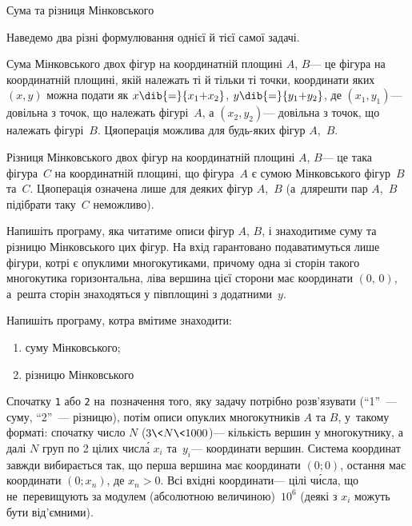 ﻿\begin{problemAllDefault}{Сума та різниця Мінковського}

\begin{small}

Наведемо два різні формулювання однієї й тієї самої задачі.

\noindent\hrulefill

Сума Мінковського двох фігур на координатній площині $A$, $B$\nolinebreak[3] --- це фігура на координатній площині, якій належать ті й тільки ті точки, координати яких $(x,y)$  можна подати як 
$x\dib{{=}}{x_1{+}x_2}$,
$y\dib{{=}}{y_1{+}y_2}$,
де $(x_1,y_1)$\nolinebreak[3] --- довільна з точок, що належать фігурі~$A$, 
а $(x_2,y_2)$\nolinebreak[3] --- довільна з точок, що належать фігурі~$B$.
Ця\nolinebreak[3] операція можлива для будь-яких фігур $A$,~$B$.

Різниця Мінковського двох фігур на координатній площині $A$, $B$\nolinebreak[3] --- це така фігура~$C$ на координатній площині, що фігура~$A$ є сумою Мінковського фігур~$B$ та~$C$. 
Ця\nolinebreak[3] операція означена лише для деяких фігур $A$,~$B$ (а~для\nolinebreak[2] решти пар $A$,~$B$ підібрати таку~$C$ неможливо).

Напишіть програму, яка читатиме описи фігур $A$, $B$, і знаходитиме суму та різницю Мінковського цих фігур. На вхід гарантовано подаватимуться лише фігури, котрі є опуклими многокутиками, причому одна зі сторін такого многокутика горизонтальна, ліва вершина цієї сторони має координати $(0,\,0)$, а~решта сторін знаходяться у півплощині з додатними~$y$.

Напишіть програму, котра вмітиме знаходити:
\begin{enumerate}
\item
суму Мінковського;
\item
різницю Мінковського
\end{enumerate}

\InputFile
Спочатку \texttt{1} або \texttt{2} на~позначення того, яку задачу потрібно розв'язувати (``1''~--- суму, ``2''~--- різницю), потім описи опуклих многокутників $A$ та $B$, у~такому форматі: спочатку число $N$ (${3{\<}N{\<}1000}$)\nolinebreak[3] --- кількість вершин у многокутнику, а далі $N$ груп по 2 цілих числ\'{а} $x_i$ та~$y_i$\nolinebreak[3] --- координати вершин. Система координат завжди вибирається так, що перша вершина має координати $(0; 0)$, остання має координати $(0;x_n)$, де $x_n{>}0$. Всі вхідні координати\nolinebreak[3] --- цілі ч\'{и}сла, що не~перевищують за модулем (абсолютною величиною)~$10^6$ (деякі з $x_i$ можуть бути від'ємними). 


\end{small}
\end{problemAllDefault}

